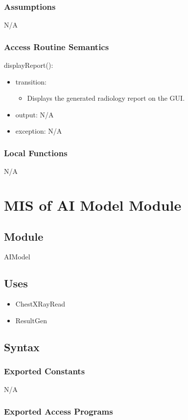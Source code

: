 \documentclass[12pt, titlepage]{article}
\begin{document}
\subsubsection{Assumptions}
N/A
\subsubsection{Access Routine Semantics}

\noindent displayReport():
\begin{itemize}
\item transition: \begin{itemize}
    \item Displays the generated radiology report on the GUI.
\end{itemize}
\item output: N/A
\item exception: N/A
\end{itemize}

\subsubsection{Local Functions}
N/A
\newpage

\section{MIS of AI Model Module} \label{Module} 
\subsection{Module}
AIModel
\subsection{Uses}
\begin{itemize}
    \item ChestXRayRead
    \item ResultGen
\end{itemize}
\subsection{Syntax}

\subsubsection{Exported Constants}
N/A
\subsubsection{Exported Access Programs}
\end{document}
